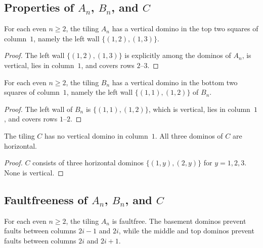 \subsection{Properties of $A_n$, $B_n$, and $C$}

\begin{lemma}
\label{lem.details.domino.TilingA-hasTopVertical}
\leanhelper
\leanok
For each even $n \ge 2$, the tiling $A_n$ has a vertical domino in the top
two squares of column~$1$, namely the left wall $\{(1,2),(1,3)\}$.
\end{lemma}

\begin{proof}
\leanok
The left wall $\{(1,2),(1,3)\}$ is explicitly among the dominos of $A_n$,
is vertical, lies in column~$1$, and covers rows $2$--$3$.
\end{proof}

\begin{lemma}
\label{lem.details.domino.TilingB-hasBottomVertical}
\leanhelper
\leanok
For each even $n \ge 2$, the tiling $B_n$ has a vertical domino in the bottom
two squares of column~$1$, namely the left wall $\{(1,1),(1,2)\}$ of $B_n$.
\end{lemma}

\begin{proof}
\leanok
The left wall of $B_n$ is $\{(1,1),(1,2)\}$, which is vertical, lies in
column~$1$, and covers rows $1$--$2$.
\end{proof}

\begin{lemma}
\label{lem.details.domino.TilingC-noVertical}
\leanhelper
\leanok
The tiling $C$ has no vertical domino in column~$1$. All three dominos
of $C$ are horizontal.
\end{lemma}

\begin{proof}
\leanok
$C$ consists of three horizontal dominos $\{(1,y),(2,y)\}$ for $y = 1, 2, 3$.
None is vertical.
\end{proof}

\subsection{Faultfreeness of $A_n$, $B_n$, and $C$}

\begin{lemma}
\label{lem.details.domino.TilingA-faultfree}
\leanhelper
\leanok
For each even $n \ge 2$, the tiling $A_n$ is faultfree.
The basement dominos prevent faults between columns $2i-1$ and $2i$,
while the middle and top dominos prevent faults between columns $2i$ and $2i+1$.
\end{lemma}

